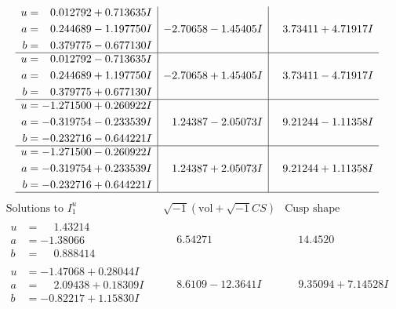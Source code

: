 \documentclass[1p]{elsarticle_modified}
\theoremstyle{definition}
\newcommand{\I}{\sqrt{-1}}
\begin{document}
$$\begin{array}{c|c|c}
\begin{aligned}
u &= \phantom{-}0.012792 + 0.713635 I \\
a &= \phantom{-}0.244689 - 1.197750 I \\
b &= \phantom{-}0.379775 - 0.677130 I\end{aligned}
 & -2.70658 - 1.45405 I & \phantom{-}3.73411 + 4.71917 I \\ \hline\begin{aligned}
u &= \phantom{-}0.012792 - 0.713635 I \\
a &= \phantom{-}0.244689 + 1.197750 I \\
b &= \phantom{-}0.379775 + 0.677130 I\end{aligned}
 & -2.70658 + 1.45405 I & \phantom{-}3.73411 - 4.71917 I \\ \hline\begin{aligned}
u &= -1.271500 + 0.260922 I \\
a &= -0.319754 - 0.233539 I \\
b &= -0.232716 - 0.644221 I\end{aligned}
 & \phantom{-}1.24387 - 2.05073 I & \phantom{-}9.21244 - 1.11358 I \\ \hline\begin{aligned}
u &= -1.271500 - 0.260922 I \\
a &= -0.319754 + 0.233539 I \\
b &= -0.232716 + 0.644221 I\end{aligned}
 & \phantom{-}1.24387 + 2.05073 I & \phantom{-}9.21244 + 1.11358 I\\
 \hline 
 \end{array}$$\newpage$$\begin{array}{c|c|c}  
\text{Solutions to }I^u_{1}& \I (\text{vol} + \sqrt{-1}CS) & \text{Cusp shape}\\
 \hline 
\begin{aligned}
u &= \phantom{-}1.43214\phantom{ +0.000000I} \\
a &= -1.38066\phantom{ +0.000000I} \\
b &= \phantom{-}0.888414\phantom{ +0.000000I}\end{aligned}
 & \phantom{-}6.54271\phantom{ +0.000000I} & \phantom{-}14.4520\phantom{ +0.000000I} \\ \hline\begin{aligned}
u &= -1.47068 + 0.28044 I \\
a &= \phantom{-}2.09438 + 0.18309 I \\
b &= -0.82217 + 1.15830 I\end{aligned}
 & \phantom{-}8.6109 - 12.3641 I & \phantom{-}9.35094 + 7.14528 I \\ \hline\begin{aligned}

\end{aligned}
\end{array}$$
\end{document}
